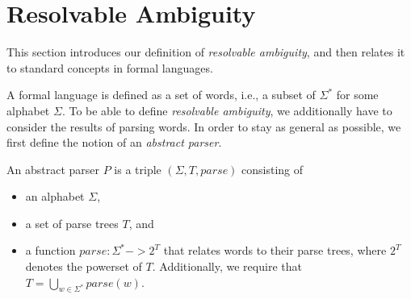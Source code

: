 \documentclass[runningheads]{llncs}
\newcommand{\T}{\Sigma} %
\newcommand{\parse}{\mathit{parse}} %
\newcommand{\regex}{\mathit{Reg}}
\begin{document}






\section{Resolvable Ambiguity} \label{sec:resolvable-definition}

This section introduces our definition of \emph{resolvable ambiguity}, and then relates it to standard concepts in formal languages.

A formal language is defined as a set of words, i.e., a subset of $\T^{*}$ for some alphabet $\T$. To be able to define \emph{resolvable ambiguity}, we additionally have to consider the results of parsing words. In order to stay as general as possible, we first define the notion of an \emph{abstract parser}.

\begin{definition}
  An abstract parser $P$ is a triple $(\T, T, \parse)$ consisting of
\begin{itemize}
\item an alphabet $\T$,
\item a set of parse trees $T$, and
\item a function $\parse : \T^{*} -> 2^T$ that relates words to their parse trees, where $2^T$ denotes the powerset of $T$. Additionally, we require that $T = \bigcup_{w \in \T^{*}} \parse(w)$.
\end{itemize}
\end{definition}
\end{document}

